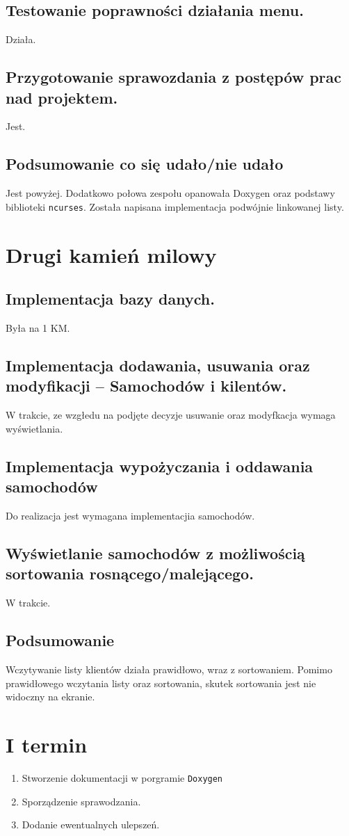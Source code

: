 \documentclass[11pt]{article}
\begin{document}
\subsection{Testowanie poprawności działania menu.}
\label{sec:orgd133aa4}
Działa.
\subsection{Przygotowanie sprawozdania z postępów prac nad projektem.}
\label{sec:org490366f}
Jest.
\subsection{Podsumowanie co się udało/nie udało}
\label{sec:org945ea0a}
Jest powyżej.
Dodatkowo połowa zespołu opanowała Doxygen oraz podstawy biblioteki \texttt{ncurses}.
Została napisana implementacja podwójnie linkowanej listy.
\section{Drugi kamień milowy}
\label{sec:org3c67d8f}
\subsection{Implementacja bazy danych.}
\label{sec:org8632342}
Była na 1 KM.
\subsection{Implementacja dodawania, usuwania oraz modyfikacji -- Samochodów i kilentów.}
\label{sec:org02b9fd2}
W trakcie, ze wzgłedu na podjęte decyzje usuwanie oraz modyfkacja wymaga wyświetlania.
\subsection{Implementacja wypożyczania i oddawania samochodów}
\label{sec:orgd6d5481}
Do realizacja jest wymagana implementacjia samochodów.
\subsection{Wyświetlanie samochodów z możliwością sortowania rosnącego/malejącego.}
\label{sec:orgeb6a5b1}
W trakcie.
\subsection{Podsumowanie}
\label{sec:org4a3f6c9}
Wczytywanie listy klientów działa prawidłowo, wraz z sortowaniem.
Pomimo prawidłowego wczytania listy oraz sortowania, skutek sortowania jest nie widoczny na ekranie.
\section{I termin}
\label{sec:org9489915}
\begin{enumerate}
\item Stworzenie dokumentacji w porgramie \texttt{Doxygen}
\item Sporządzenie sprawodzania.
\item Dodanie ewentualnych ulepszeń.
\end{enumerate}
\end{document}
